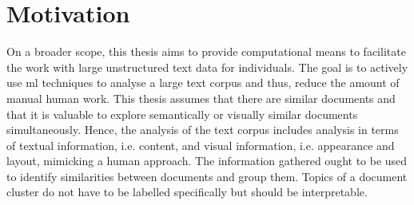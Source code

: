 \section{Motivation}\label{sec:motivation}

On a broader scope, this thesis aims to provide computational means to facilitate the work with large unstructured text data for individuals.
The goal is to actively use \ac{ml} techniques to analyse a large text corpus and thus, reduce the amount of manual human work.
This thesis assumes that there are similar documents and that it is valuable to explore semantically or visually similar documents simultaneously.
Hence, the analysis of the text corpus includes analysis in terms of textual information, i.e. content, and visual information, i.e. appearance and layout, mimicking a human approach.
The information gathered ought to be used to identify similarities between documents and group them.
Topics of a document cluster do not have to be labelled specifically but should be interpretable.